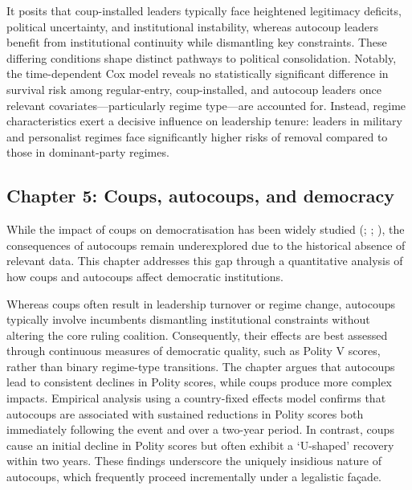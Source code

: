 \documentclass[
  12pt,
]{report}
\begin{document}
It posits that coup-installed leaders typically face heightened
legitimacy deficits, political uncertainty, and institutional
instability, whereas autocoup leaders benefit from institutional
continuity while dismantling key constraints. These differing conditions
shape distinct pathways to political consolidation. Notably, the
time-dependent Cox model reveals no statistically significant difference
in survival risk among regular-entry, coup-installed, and autocoup
leaders once relevant covariates---particularly regime type---are
accounted for. Instead, regime characteristics exert a decisive
influence on leadership tenure: leaders in military and personalist
regimes face significantly higher risks of removal compared to those in
dominant-party regimes.

\subsection*{Chapter 5: Coups, autocoups, and
democracy}\label{chapter-5-coups-autocoups-and-democracy}

While the impact of coups on democratisation has been widely studied
(;
;
), the consequences of
autocoups remain underexplored due to the historical absence of relevant
data. This chapter addresses this gap through a quantitative analysis of
how coups and autocoups affect democratic institutions.

Whereas coups often result in leadership turnover or regime change,
autocoups typically involve incumbents dismantling institutional
constraints without altering the core ruling coalition. Consequently,
their effects are best assessed through continuous measures of
democratic quality, such as Polity V scores, rather than binary
regime-type transitions. The chapter argues that autocoups lead to
consistent declines in Polity scores, while coups produce more complex
impacts. Empirical analysis using a country-fixed effects model confirms
that autocoups are associated with sustained reductions in Polity scores
both immediately following the event and over a two-year period. In
contrast, coups cause an initial decline in Polity scores but often
exhibit a `U-shaped' recovery within two years. These findings
underscore the uniquely insidious nature of autocoups, which frequently
proceed incrementally under a legalistic façade.
\end{document}
